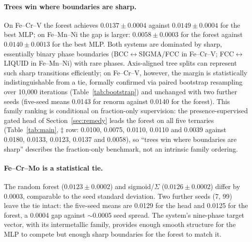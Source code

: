 \documentclass[preprint,12pt,authoryear]{elsarticle}
\begin{document}
\paragraph{Trees win where boundaries are sharp.}
On Fe--Cr--V the forest achieves $0.0137 \pm 0.0004$ against
$0.0149 \pm 0.0004$ for the best MLP; on Fe--Mn--Ni the gap is larger:
$0.0058 \pm 0.0003$ for the forest against $0.0140 \pm 0.0013$ for the
best MLP. Both systems are dominated by sharp, essentially binary phase
boundaries (BCC$\leftrightarrow$SIGMA/\allowbreak FCC in Fe--Cr--V;
FCC$\leftrightarrow$LIQUID in Fe--Mn--Ni) with rare phases.
Axis-aligned tree splits can represent such sharp transitions efficiently;
on Fe--Cr--V, however, the margin is statistically indistinguishable from
a tie, formally confirmed via paired bootstrap resampling over 10{,}000
iterations (Table~\ref{tab:bootstrap}) and unchanged with two further
seeds (five-seed means 0.0143 for renorm against 0.0140 for the forest).
This family ranking is conditional
on fraction-only supervision: the presence-supervised gated head of
Section~\ref{sec:remedy} leads the forest on all five ternaries
(Table~\ref{tab:main}, $\ddagger$ row: 0.0100, 0.0075, 0.0110, 0.0110 and
0.0039 against 0.0180, 0.0133, 0.0123, 0.0137 and 0.0058), so ``trees win
where boundaries are sharp'' describes the fraction-only benchmark, not an
intrinsic family ordering.

\paragraph{Fe--Cr--Mo is a statistical tie.}
The random forest ($0.0123 \pm 0.0002$) and sigmoid/$\Sigma$
($0.0126 \pm 0.0002$) differ by 0.0003, comparable to the seed standard
deviation. Two further seeds (7, 99) leave the tie intact: the five-seed
means are 0.0129 for the head and 0.0125 for the forest, a 0.0004 gap
against $\sim$0.0005 seed spread. The system's nine-phase target vector, with its intermetallic
family, provides enough smooth structure for the MLP to compete but enough
sharp boundaries for the forest to match it.
\end{document}
